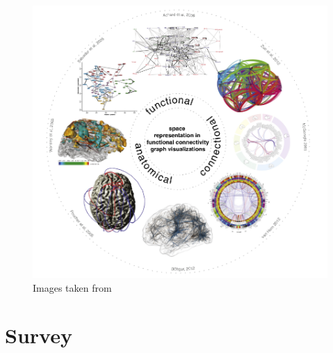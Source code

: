 \documentclass{article}
\begin{document}
\begin{multicols}{2}
\begin{figure}[ht]
\centering
\includegraphics[width = 1.8\columnwidth]{taxonomy}
\caption{Images taken from \cite{visualizingHumanConnectome}}
\label{fig:taxonomy}
\end{figure}

\section{Survey}
\label{sec:survey}


\end{multicols}
\end{document}

